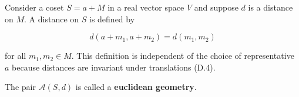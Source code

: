 Consider a coset $S = a + M$ in a real vector space $V$ and suppose $d$ is a distance on $M$. A distance on $S$ is defined by

$$d(a + m_1, a + m_2) = d(m_1, m_2)$$

for all $m_1, m_2 \in M$. This definition is independent of the choice of representative $a$ because distances are invariant under translations (D.4).

The pair $\mathcal{A}(S, d)$ is called a \textbf{euclidean geometry}.
